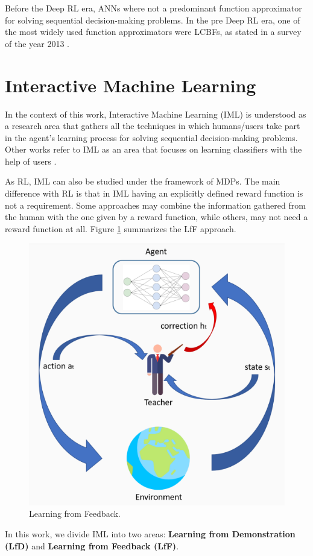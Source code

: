 Before the Deep RL era, ANNs where not a predominant function approximator for solving sequential decision-making problems. In the pre Deep RL era, one of the most widely used function approximators were LCBFs, as stated in a survey of the year 2013 \cite{kober2013reinforcement}. 

\section{Interactive Machine Learning \cite{Argall2009, amershi2014power,billing2010formalism, Chernova2014, cuayahuitl2013machine}}

In the context of this work, Interactive Machine Learning (IML) is understood as a research area that gathers all the techniques in which humans/users take part in the agent's learning process for solving sequential decision-making problems. Other works refer to IML as an area that focuses on learning classifiers with the help of users \cite{fails2003interactive, ware2001interactive, amershi2012regroup, ngo2014efficient}.

As RL, IML can also be studied under the framework of MDPs. The main difference with RL is that in IML having an explicitly defined reward function is not a requirement. Some approaches may combine the information gathered from the human with the one given by a reward function, while others, may not need a reward function at all. Figure \ref{fig:LfF} summarizes the LfF approach.

\begin{figure}[h]
    \centering
    \includegraphics[width=0.5\linewidth]{imagenes/cap1/LfF.png}
    \caption{Learning from Feedback.}
    \label{fig:LfF}
\end{figure}

In this work, we divide IML into two areas: \textbf{Learning from Demonstration (LfD)} and \textbf{Learning from Feedback (LfF)}. 

